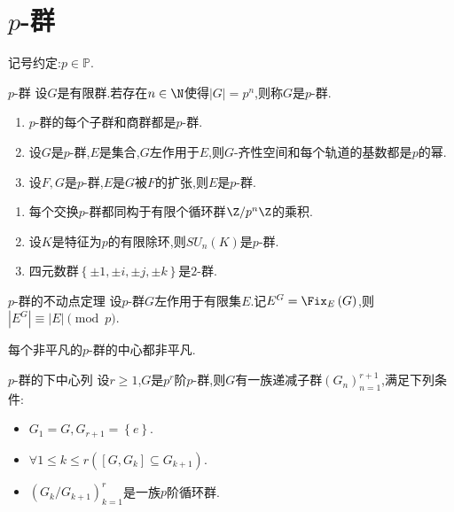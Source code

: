 \section{\texorpdfstring{$p$}{p}-群}

记号约定:$p\in\mathbb{P}$.

\begin{definition}{$p$-群}{}
	设$G$是有限群.若存在$n\in\N$使得$\left|G\right|=p^{n}$,则称$G$是$p$-群.
\end{definition}

\begin{proposition}{}{}
	\begin{enumerate}
		\item $p$-群的每个子群和商群都是$p$-群.
		\item 设$G$是$p$-群,$E$是集合,$G$左作用于$E$,则$G$-齐性空间和每个轨道的基数都是$p$的幂.
		\item 设$F,G$是$p$-群,$E$是$G$被$F$的扩张,则$E$是$p$-群.
	\end{enumerate}
\end{proposition}

\begin{example}{}{}
	\begin{enumerate}
		\item 每个交换$p$-群都同构于有限个循环群$\Z/p^{n}\Z$的乘积.
		\item 设$K$是特征为$p$的有限除环,则$SU_{n}\left(K\right)$是$p$-群.
		\item 四元数群$\left\{\pm 1,\pm i,\pm j,\pm k\right\}$是$2$-群.
	\end{enumerate}
\end{example}

\begin{proposition}{$p$-群的不动点定理}{}
	设$p$-群$G$左作用于有限集$E$.记$E^{G}=\Fix_{E}\left(G\right)$,则$\left|E^{G}\right|\equiv\left|E\right|\pmod{p}$.
\end{proposition}

\begin{corollary}{}{}
	每个非平凡的$p$-群的中心都非平凡.
\end{corollary}

\begin{theorem}{$p$-群的下中心列}{}
	设$r\geq 1$,$G$是$p^{r}$阶$p$-群,则$G$有一族递减子群$\left(G_{n}\right)_{n=1}^{r+1}$,满足下列条件:
	\begin{itemize}
		\item $G_{1}=G,G_{r+1}=\left\{e\right\}$.
		\item $\forall 1\leq k\leq r\left(\left[G,G_{k}\right]\subseteq G_{k+1}\right)$.
		\item $\left(G_{k}/G_{k+1}\right)_{k=1}^{r}$是一族$p$阶循环群.
	\end{itemize}
\end{theorem}

